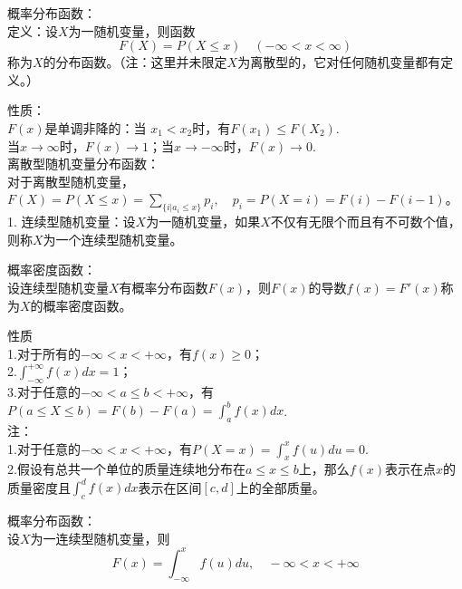 \begin{definition}
  概率分布函数：\\
  定义：设$X$为一随机变量，则函数
$$
F(X)=P(X\leq x)\quad(-\infty<x<\infty)
$$
称为$X$的分布函数。（注：这里并未限定$X$为离散型的，它对任何随机变量都有定义。）\\

\end{definition}
性质：\\
   $F(x)\text{是单调非降的：当}$ $x_1<x_2$时，有$F(x_1)\leq F(X_2)$.\\
   当$x \rightarrow \infty$时，$F(x)\rightarrow1$；当$x \rightarrow-\infty$时，$F(x)\rightarrow0$.\\
   离散型随机变量分布函数：\\
   对于离散型随机变量，$F(X)=P(X\leq x)=\sum_{\{i|a_i\leq x\}}p_i, \quad p_i=P(X=i)=F(i)-F(i-1)$。\\
   1. 连续型随机变量：设$X$为一随机变量，如果$X$不仅有无限个而且有不可数个值，则称$X$为一个连续型随机变量。

   \begin{definition}
    概率密度函数：\\
    设连续型随机变量$X$有概率分布函数$F(x)$，则$F(x)$的导数$f(x)=F'(x)$称为$X$的概率密度函数。
   \end{definition}
   性质\\
     1.对于所有的$-\infty<x<+\infty$，有$f(x)\ge 0$；\\
     2.$\int_{-\infty}^{+\infty}f(x)dx=1$；\\
     3.对于任意的$-\infty<a\leq b<+\infty$，有$P(a\leq X\leq b)=F(b)-F(a)=\int_{a}^{b}f(x)dx$.\\
   注：\\
     1.对于任意的$-\infty<x<+\infty$，有$P(X=x)=\int_{x}^{x}f(u)du=0$.\\
     2.假设有总共一个单位的质量连续地分布在$a\leq x\leq b$上，那么$f(x)$表示在点$x$的质量密度且$\int_{c}^{d}f(x)dx$表示在区间$[c, d]$上的全部质量。\\
     \begin{definition}
      概率分布函数：\\
      设$X$为一连续型随机变量，则
      $$
      F(x)=\int_{-\infty}^xf(u)du,\quad-\infty<x<+\infty
      $$
     \end{definition}

